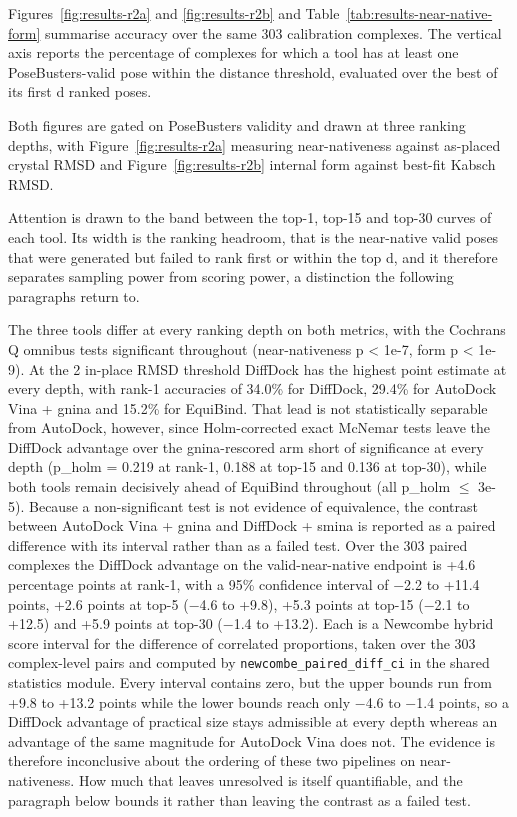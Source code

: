 Figures~\ref{fig:results-r2a} and \ref{fig:results-r2b} and Table~\ref{tab:results-near-native-form} summarise accuracy over the same 303 calibration complexes. The vertical axis reports the percentage of complexes for which a tool has at least one PoseBusters-valid pose within the distance threshold, evaluated over the best of its first d ranked poses.

Both figures are gated on PoseBusters validity and drawn at three ranking depths, with Figure~\ref{fig:results-r2a} measuring near-nativeness against as-placed crystal RMSD and Figure~\ref{fig:results-r2b} internal form against best-fit Kabsch RMSD.

Attention is drawn to the band between the top-1, top-15 and top-30 curves of each tool. Its width is the ranking headroom, that is the near-native valid poses that were generated but failed to rank first or within the top d, and it therefore separates sampling power from scoring power, a distinction the following paragraphs return to.

The three tools differ at every ranking depth on both metrics, with the Cochran\textquotesingle s Q omnibus tests significant throughout (near-nativeness p \textless{} 1e-7, form p \textless{} 1e-9). At the 2\angstrom{} in-place RMSD threshold DiffDock has the highest point estimate at every depth, with rank-1 accuracies of 34.0\% for DiffDock, 29.4\% for AutoDock Vina + gnina and 15.2\% for EquiBind. That lead is not statistically separable from AutoDock, however, since Holm-corrected exact McNemar tests leave the DiffDock advantage over the gnina-rescored arm short of significance at every depth (p\_holm = 0.219 at rank-1, 0.188 at top-15 and 0.136 at top-30), while both tools remain decisively ahead of EquiBind throughout (all p\_holm \ensuremath{\leq} 3e-5). Because a non-significant test is not evidence of equivalence, the contrast between AutoDock Vina + gnina and DiffDock + smina is reported as a paired difference with its interval rather than as a failed test. Over the 303 paired complexes the DiffDock advantage on the valid-near-native endpoint is +4.6 percentage points at rank-1, with a 95\% confidence interval of \ensuremath{-}2.2 to +11.4 points, +2.6 points at top-5 (\ensuremath{-}4.6 to +9.8), +5.3 points at top-15 (\ensuremath{-}2.1 to +12.5) and +5.9 points at top-30 (\ensuremath{-}1.4 to +13.2). Each is a Newcombe hybrid score interval for the difference of correlated proportions, taken over the 303 complex-level pairs and computed by \texttt{newcombe\_paired\_diff\_ci} in the shared statistics module. Every interval contains zero, but the upper bounds run from +9.8 to +13.2 points while the lower bounds reach only \ensuremath{-}4.6 to \ensuremath{-}1.4 points, so a DiffDock advantage of practical size stays admissible at every depth whereas an advantage of the same magnitude for AutoDock Vina does not. The evidence is therefore inconclusive about the ordering of these two pipelines on near-nativeness. How much that leaves unresolved is itself quantifiable, and the paragraph below bounds it rather than leaving the contrast as a failed test.

